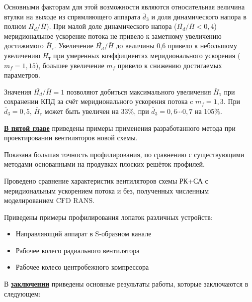 Основными факторам для этой возможности являются относительная величина втулки на выходе из спрямляющего аппарата \(\bar{d}_3\) и доля динамического напора в полном \(\bar{H_d}/\bar{H}\)).
При малой доле динамического напора (\(\bar{H_d}/\bar{H}<0,4\)) меридиональное ускорение потока не привело к заметному увеличению достижимого \(\bar{H}_\text{т}\).
Увеличение \(\bar{H_d}/\bar{H}\) до величины 0,6 привело к небольшому увеличению \(\bar{H}_\text{т}\) при умеренных коэффициентах меридионального ускорения (\(m_f=1,15\)), большее увеличение \(m_f\) привело к снижению достигаемых параметров.

Значения \(\bar{H_d}/\bar{H} = 1\) позволяют добиться максимального увеличения  \(\bar{H}_\text{т}\) при сохранении КПД за счёт меридионального ускорения потока c \(m_f=1,3\).
При \(\bar{d}_3 =0,5\), \(\bar{H}_\text{т}\) может быть увеличен на 33\%, при \(\bar{d}_3 =0,6 \cdots 0,7\) на 105\%.

\underline{\textbf{В пятой главе}} приведены примеры применения разработанного метода при проектировании вентиляторов новой схемы.


Показана большая точность профилирования, по сравнению с существующими методами основанными на продувках плоских решёток профилей.

Проведено сравнение характеристик вентиляторов схемы РК+СА с меридиональным ускорением потока и без, полученных численным моделированием CFD RANS.

Приведены примеры профилирования лопаток различных устройств:
\begin{itemize}
\item Направляющий аппарат в S-образном канале
\item Рабочее колесо радиального вентилятора
\item Рабочее колесо центробежного компрессора
\end{itemize}

\FloatBarrier
{}                                  %
В \underline{\textbf{заключении}} приведены основные результаты работы, которые заключаются в следующем:


\clearpage
{}                                %

